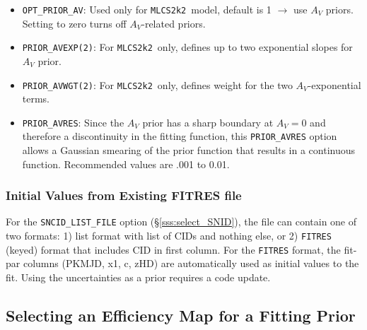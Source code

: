 \documentclass[12pt]{article}
\newcommand{\mlcs}{{\tt MLCS2k2}}
\begin{document}
\begin{itemize}
%
  \item \verb|OPT_PRIOR_AV|: 
    Used only for \mlcs\ model, default is 1 $\to$ use $A_V$ priors.
    Setting to zero turns off $A_V$-related priors.
%
 \item \verb|PRIOR_AVEXP(2)|:
   For \mlcs\ only, defines up to two exponential slopes for $A_V$ prior.
%
 \item \verb|PRIOR_AVWGT(2)|:
   For \mlcs\ only, defines weight for the two $A_V$-exponential terms.
%
 \item \verb|PRIOR_AVRES|:
   Since the $A_V$ prior has a sharp boundary at $A_V=0$ and therefore
   a discontinuity in the fitting function, this {\tt PRIOR\_AVRES}
   option allows a Gaussian smearing of the prior function that results
   in a continuous function. Recommended values are .001 to 0.01.
\end{itemize}


\subsubsection{Initial Values from Existing FITRES file}
\label{sss:fitres_initial_values}

For the {\tt SNCID\_LIST\_FILE} option (\S\ref{sss:select_SNID}),
the file can contain one of two formats:
1) list format with list of CIDs and nothing else, or 
2) {\tt FITRES} (keyed) format that includes CID in first column.
For the {\tt FITRES} format, the fit-par columns (PKMJD, x1, c, zHD)
are automatically used as initial values to the fit.
Using the uncertainties as a prior requires a code update.


   \subsection{Selecting an Efficiency Map for a Fitting Prior}
   \label{subsec:prior_eff}
\end{document}
